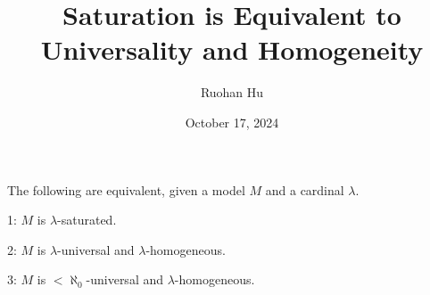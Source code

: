 \documentclass[a4paper]{article}
\title{Saturation is Equivalent to Universality and Homogeneity}
\date{October 17, 2024}
\author{Ruohan Hu}
\begin{document}
\maketitle
\par{
    The following are equivalent, given a model \(M\) and a cardinal \(\lambda\).
}\par{
    1: \(M\) is \(\lambda\)-saturated.
}\par{
    2: \(M\) is \(\lambda\)-universal and \(\lambda\)-homogeneous.
}\par{
    3: \(M\) is \(< \aleph _0\)-universal and \(\lambda\)-homogeneous.
}
\printbibliography
\end{document}
